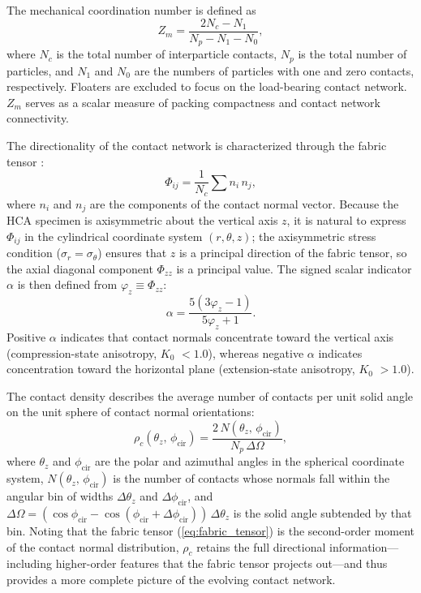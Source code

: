 \documentclass[a4paper,fleqn]{cas-sc}
\newcommand{\Kzero}{\ensuremath{K_0}}
\begin{document}
The mechanical coordination number \citep{Thornton2000,Oda1977} is defined as
\begin{equation}
Z_m = \frac{2N_c - N_1}{N_p - N_1 - N_0},
\label{eq:zm_definition_method}
\end{equation}
where $N_c$ is the total number of interparticle contacts, $N_p$ is the total number of particles, and $N_1$ and $N_0$ are the numbers of particles with one and zero contacts, respectively. Floaters are excluded to focus on the load-bearing contact network. $Z_m$ serves as a scalar measure of packing compactness and contact network connectivity.

The directionality of the contact network is characterized through the fabric tensor \citep{Oda1982fabric,Oda1982stat}:
\begin{equation}
\Phi_{ij} = \frac{1}{N_c}\sum n_i\,n_j,
\label{eq:fabric_tensor}
\end{equation}
where $n_i$ and $n_j$ are the components of the contact normal vector. Because the HCA specimen is axisymmetric about the vertical axis $z$, it is natural to express $\Phi_{ij}$ in the cylindrical coordinate system $(r,\theta,z)$; the axisymmetric stress condition ($\sigma_r = \sigma_\theta$) ensures that $z$ is a principal direction of the fabric tensor, so the axial diagonal component $\Phi_{zz}$ is a principal value. The signed scalar indicator $\alpha$ \citep{YimsiriSoga2010,Otsubo2022} is then defined from $\varphi_z \equiv \Phi_{zz}$:
\begin{equation}
\alpha = \frac{5(3\varphi_z - 1)}{5\varphi_z + 1}.
\label{eq:alpha_definition_method}
\end{equation}
Positive $\alpha$ indicates that contact normals concentrate toward the vertical axis (compression-state anisotropy, \Kzero{} $< 1.0$), whereas negative $\alpha$ indicates concentration toward the horizontal plane (extension-state anisotropy, \Kzero{} $> 1.0$).

The contact density \citep{Han2023} describes the average number of contacts per unit solid angle on the unit sphere of contact normal orientations:
\begin{equation}
\rho_c(\theta_z,\,\phi_{\mathrm{cir}}) = \frac{2\,N(\theta_z,\,\phi_{\mathrm{cir}})}{N_p\,\Delta\Omega},
\label{eq:contact_density}
\end{equation}
where $\theta_z$ and $\phi_{\mathrm{cir}}$ are the polar and azimuthal angles in the spherical coordinate system, $N(\theta_z,\,\phi_{\mathrm{cir}})$ is the number of contacts whose normals fall within the angular bin of widths $\Delta\theta_z$ and $\Delta\phi_{\mathrm{cir}}$, and $\Delta\Omega = (\cos\phi_{\mathrm{cir}} - \cos(\phi_{\mathrm{cir}}+\Delta\phi_{\mathrm{cir}}))\,\Delta\theta_z$ is the solid angle subtended by that bin. Noting that the fabric tensor (\cref{eq:fabric_tensor}) is the second-order moment of the contact normal distribution, $\rho_c$ retains the full directional information---including higher-order features that the fabric tensor projects out---and thus provides a more complete picture of the evolving contact network.
\end{document}
